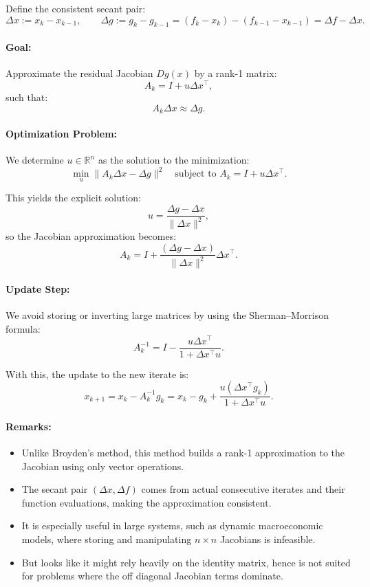 \documentclass[a4paper,12pt]{article}
\begin{document}
Define the consistent secant pair:
\[
\Delta x := x_k - x_{k-1}, \qquad \Delta g := g_k - g_{k-1} = (f_k - x_k) - (f_{k-1} - x_{k-1}) = \Delta f - \Delta x.
\]

\vspace{0.5em}
\paragraph{Goal:} Approximate the residual Jacobian \( Dg(x) \) by a rank-1 matrix:
\[
A_k = I + u \Delta x^\top,
\]
such that:
\[
A_k \Delta x \approx \Delta g.
\]

\vspace{0.5em}
\paragraph{Optimization Problem:}  
We determine \( u \in \mathbb{R}^n \) as the solution to the minimization:
\[
\min_{u} \| A_k \Delta x - \Delta g \|^2 \quad \text{subject to } A_k = I + u \Delta x^\top.
\]

This yields the explicit solution:
\[
u = \frac{\Delta g - \Delta x}{\|\Delta x\|^2},
\]
so the Jacobian approximation becomes:
\[
A_k = I + \frac{(\Delta g - \Delta x)}{\|\Delta x\|^2} \Delta x^\top.
\]

\vspace{0.5em}
\paragraph{Update Step:}
We avoid storing or inverting large matrices by using the Sherman–Morrison formula:
\[
A_k^{-1} = I - \frac{u \Delta x^\top}{1 + \Delta x^\top u}.
\]

With this, the update to the new iterate is:
\[
x_{k+1} = x_k - A_k^{-1} g_k = x_k - g_k + \frac{u (\Delta x^\top g_k)}{1 + \Delta x^\top u}.
\]

\vspace{0.5em}
\paragraph{Remarks:}
\begin{itemize}
    \item Unlike Broyden’s method, this method builds a rank-1 approximation to the Jacobian using only vector operations.
    \item The secant pair \( (\Delta x, \Delta f) \) comes from actual consecutive iterates and their function evaluations, making the approximation consistent.
    \item It is especially useful in large systems, such as dynamic macroeconomic models, where storing and manipulating \( n \times n \) Jacobians is infeasible.
    \item But looks like it might rely heavily on the identity matrix, hence is not suited for problems where the off diagonal Jacobian terms dominate. 
\end{itemize}
\end{document}
